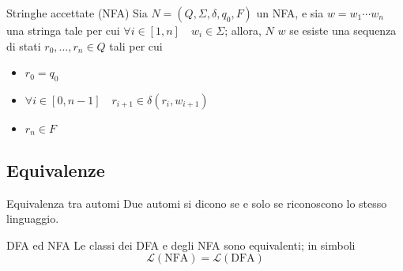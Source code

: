 \documentclass[a4paper, 12pt]{report}
\begin{document}
    \begin{frameddefn}{Stringhe accettate (NFA)}
        Sia $N = (Q, \Sigma, \delta, q_0, F)$ un NFA, e sia $w = w_1\cdots w_n$ una stringa tale per cui $\forall i \in [1, n] \quad w_i \in \Sigma$; allora, $N$  $w$ se esiste una sequenza di stati $r_0, \ldots, r_n \in Q$ tali per cui

        \begin{itemize}
            \item $r_0 = q_0$
            \item $\forall i \in [0, n - 1] \quad r_{i + 1} \in \delta(r_i, w_{i + 1})$
            \item $r_n \in F$
        \end{itemize}
    \end{frameddefn}

    \subsection{Equivalenze}

    \begin{frameddefn}{Equivalenza tra automi}
        Due automi si dicono  se e solo se riconoscono lo stesso linguaggio.
    \end{frameddefn}

    \begin{framedthm}[label={nfa equiv}]{DFA ed NFA}
        Le classi dei DFA e degli NFA sono equivalenti; in simboli $$\mathcal{L}(\mathrm{NFA}) = \mathcal{L}(\mathrm{DFA})$$
    \end{framedthm}
\end{document}
